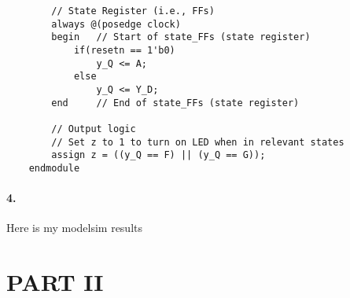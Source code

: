 \documentclass{article}
\begin{document}
\begin{verbatim}
        // State Register (i.e., FFs)
        always @(posedge clock)
        begin   // Start of state_FFs (state register)
            if(resetn == 1'b0)
                y_Q <= A;
            else
                y_Q <= Y_D;
        end     // End of state_FFs (state register)

        // Output logic
        // Set z to 1 to turn on LED when in relevant states
        assign z = ((y_Q == F) || (y_Q == G));  
    endmodule
\end{verbatim}
\paragraph{4.} Here is my modelsim results

\section*{PART II}
\end{document}
